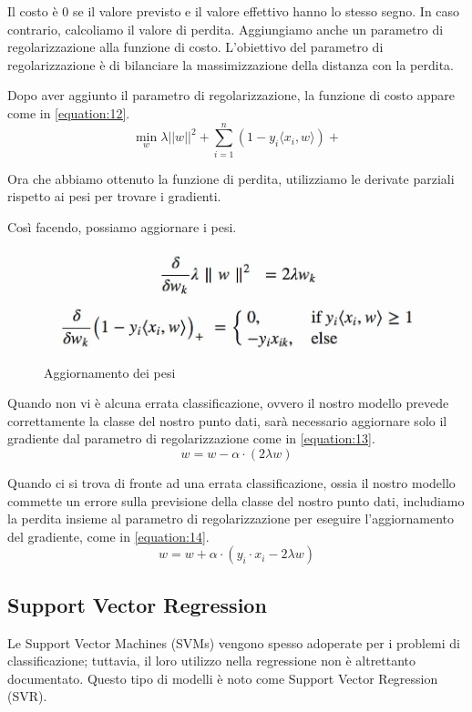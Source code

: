 Il costo è 0 se il valore previsto e il valore eﬀettivo hanno lo stesso segno. In caso contrario, calcoliamo il valore di perdita. Aggiungiamo anche un parametro di regolarizzazione alla funzione di costo. L'obiettivo del
parametro di regolarizzazione è di bilanciare la massimizzazione della distanza con la perdita. 

Dopo aver aggiunto il parametro di regolarizzazione, la funzione di costo appare come in \ref{equation:12}.
\begin{equation}
    \min_w \lambda ||w||^2 + \sum_{i=1}^{n} (1 - y_i \langle x_i, w \rangle) +
    \label{equation:12}
\end{equation}

Ora che abbiamo ottenuto la funzione di perdita, utilizziamo le derivate parziali rispetto ai pesi per trovare i gradienti. 

Così facendo, possiamo aggiornare i pesi.
\begin{figure}
    \centering
    \includegraphics[width=0.9\linewidth]{images/image32.jpeg}
    \caption{Aggiornamento dei pesi}
\end{figure}

Quando non vi è alcuna errata classificazione, ovvero il nostro modello prevede correttamente la classe del nostro punto dati, sarà necessario aggiornare solo il gradiente dal parametro di regolarizzazione come in \ref{equation:13}.
\begin{equation}
    w = w - \alpha \cdot (2\lambda w)
    \label{equation:13}
\end{equation}

Quando ci si trova di fronte ad una errata classificazione, ossia il nostro modello commette un errore sulla previsione della classe del nostro punto dati, includiamo la perdita insieme al parametro di regolarizzazione per eseguire l'aggiornamento del gradiente, come in \ref{equation:14}.
\begin{equation}
    w = w + \alpha \cdot (y_i \cdot x_i - 2\lambda w)
    \label{equation:14}
\end{equation}

\subsection{Support Vector Regression}
Le Support Vector Machines (SVMs) vengono spesso adoperate per i problemi di classificazione; tuttavia, il loro utilizzo nella regressione non è altrettanto documentato. Questo tipo di modelli è noto come Support Vector Regression (SVR).

